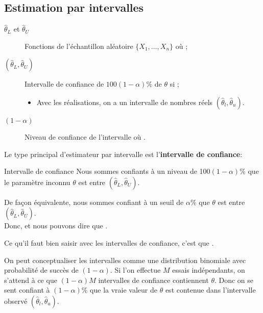 \documentclass[10pt, french]{article}
\begin{document}
\begin{multicols*}{2}
\subsection{Estimation par intervalles}
\label{sec:int-estimation}
\begin{distributions}[Notation]
\begin{description}
	\item[$\hat{\theta}_{L}$ et $\hat{\theta}_{U}$]	Fonctions de l'échantillon aléatoire $\{X_{1}, \dots, X_{n}\}$ où ;
	\item[$(\hat{\theta}_{L}, \hat{\theta}_{U})$]	Intervalle de confiance de $100(1 - \alpha)\%$ de $\theta$ si ;
		\begin{itemize}
		\item	Avec les réalisations, on a un intervalle de nombres réels $(\hat{\theta}_{l}, \hat{\theta}_{u})$.
		\end{itemize}
	\item[$(1 - \alpha)$]	Niveau de confiance de l'intervalle où .
\end{description}
\end{distributions}

Le type principal d'estimateur par intervalle est l'\textbf{intervalle de confiance}:
\begin{algo}{Intervalle de confiance}
Nous sommes confiants à un niveau de 100$(1 - \alpha)$\% que le paramètre inconnu $\theta$ est entre $(\hat{\theta}_{L}, \hat{\theta}_{U})$. 

De façon équivalente, nous sommes confiant à un seuil de $\alpha$\% que $\theta$ est entre $(\hat{\theta}_{L}, \hat{\theta}_{U})$.\\

Donc,  et nous pouvons dire que  .
\end{algo}

Ce qu'il faut bien saisir avec les intervalles de confiance, c'est que .

On peut conceptualiser les intervalles comme une distribution binomiale avec probabilité de succès de $(1 - \alpha)$. Si l'on effectue $M$ essais indépendants, on s'attend à ce que $(1 - \alpha)M$ intervalles de confiance contiennent $\theta$. Donc on se sent confiant à $(1 - \alpha)\%$ que la vraie valeur de $\theta$ est contenue dans l'intervalle observé $(\hat{\theta}_{l}, \hat{\theta}_{u})$.


\end{multicols*}
\end{document}

